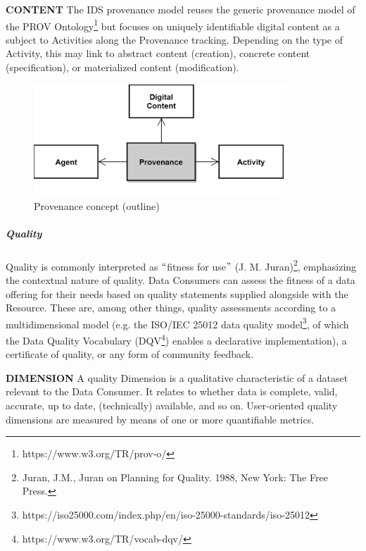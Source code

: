 \textbf{CONTENT} The IDS provenance model reuses the generic provenance model of the PROV Ontology\footnote{ https://www.w3.org/TR/prov-o/ } but focuses on uniquely identifiable digital content as a subject to Activities along the Provenance tracking. Depending on the type of Activity, this may link to abstract content (creation), concrete content (specification), or materialized content (modification). 




\begin{figure}[H]
	\begin{Center}
		\includegraphics[width=3.74in,height=1.65in]{./media/image44.png}
		\caption{Provenance concept (outline)}
		\label{fig:Provenance_concept_outline}
	\end{Center}
\end{figure}




\subparagraph*{Quality}
Quality is commonly interpreted as $``$fitness for use$"$  (J. M. Juran)\footnote{Juran, J.M., Juran on Planning for Quality. 1988, New York: The Free Press.  }, emphasizing the contextual nature of quality. Data Consumers can assess the fitness of a data offering for their needs based on quality statements supplied alongside with the Resource. These are, among other things, quality assessments according to a multidimensional model (e.g. the ISO/IEC 25012 data quality model\footnote{https://iso25000.com/index.php/en/iso-25000-standards/iso-25012 }, of which the Data Quality Vocabulary (DQV\footnote{https://www.w3.org/TR/vocab-dqv/ }) enables a declarative implementation), a certificate of quality, or any form of community feedback.


\textbf{DIMENSION} A quality Dimension is a qualitative characteristic of a dataset relevant to the Data Consumer. It relates to whether data is complete, valid, accurate, up to date, (technically) available, and so on. User-oriented quality dimensions are measured by means of one or more quantifiable metrics. 

